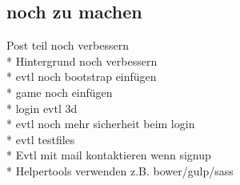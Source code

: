 \documentclass{article}
\renewcommand{\footrulewidth}{0pt}
\begin{document}
\subsection{noch zu machen}
Post teil noch verbessern
\\*
Hintergrund noch verbessern
\\*
evtl noch bootstrap einf\"ugen
\\*
game noch einf\"ugen
\\*
login evtl 3d
\\*
evtl noch mehr sicherheit beim login
\\*
evtl testfiles
\\*
Evtl mit mail kontaktieren wenn signup
\\*
Helpertools verwenden z.B. bower/gulp/sass







\renewcommand{\footrulewidth}{1pt}
\cleardoublepage
\end{document}
